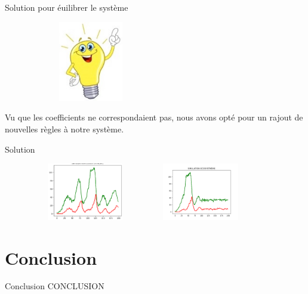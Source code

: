 \documentclass{beamer}
\begin{document}
\begin{frame}{Solution pour éuilibrer le système}
        \begin{figure}[h]
        \includegraphics[width=5.5cm, height=3.5cm]{images/idee.jpg}
        \centering
    \end{figure}
    Vu que les coefficients ne correspondaient pas, nous avons opté pour un rajout de nouvelles règles à notre système.
\end{frame}

\begin{frame}{Solution}
    \begin{figure}[h]
        \begin{minipage}[c]{.46\linewidth}
            \centering
            \includegraphics[width=5cm, height=2.5cm]{images/eq.png} 
        \end{minipage}
        \hfill%
        \begin{minipage}[c]{.46\linewidth} \pause
            \centering
            \includegraphics[width=5cm, height=2.5cm]{images/particu.png} 
        \end{minipage}
    \end{figure}
\end{frame}

\section{Conclusion}

\begin{frame}{Conclusion}
    \center CONCLUSION
\end{frame}
\end{document}
